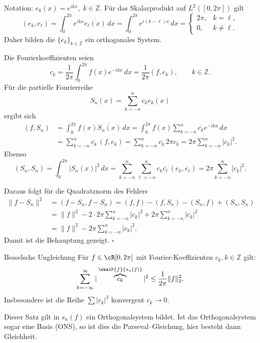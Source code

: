 \begin{beweisbox}
    Notation: $e_k(x)=e^{ikx},\; k\in\mathbb{Z}$. Für das Skalarprodukt auf $L^2([0,2\pi])$ gilt
    $$
    (e_k,e_\ell)=\int_0^{2\pi} e^{ikx}\overline{e_\ell(x)}\,dx
    =\int_0^{2\pi} e^{i(k-\ell)x}\,dx
    =\begin{cases}2\pi,& k=\ell,\\[4pt]0,& k\neq\ell.\end{cases}
    $$
    Daher bilden die $\{e_k\}_{k\in\mathbb{Z}}$ ein orthogonales System.

    Die Fourierkoeffizienten seien
    $$
    c_k=\frac{1}{2\pi}\int_0^{2\pi} f(x)e^{-ikx}\,dx=\frac{1}{2\pi}(f,e_k),
    \qquad k\in\mathbb{Z}.
    $$
    Für die partielle Fourierreihe
    $$
    S_n(x)=\sum_{k=-n}^{n} c_k e_k(x)
    $$
    ergibt sich
    \begin{align*}
    (f,S_n)
    &=\int_0^{2\pi} f(x)\overline{S_n(x)}\,dx
    =\int_0^{2\pi} f(x)\sum_{k=-n}^{n}\overline{c_k}e^{-ikx}\,dx\\
    &=\sum_{k=-n}^{n}\overline{c_k}\,(f,e_k)
    =\sum_{k=-n}^{n}\overline{c_k}\,2\pi c_k
    =2\pi\sum_{k=-n}^{n}|c_k|^2.
    \end{align*}
    Ebenso
    $$
    (S_n,S_n)=\int_0^{2\pi}|S_n(x)|^2\,dx
    =\sum_{k=-n}^{n}\sum_{\ell=-n}^{n} c_k\overline{c_\ell}\,(e_k,e_\ell)
    =2\pi\sum_{k=-n}^{n}|c_k|^2.
    $$

    Daraus folgt für die Quadratznorm des Fehlers
    \begin{align*}
    \|f-S_n\|^2
    &=(f-S_n,f-S_n)=(f,f)-(f,S_n)-(S_n,f)+(S_n,S_n)\\
    &=\|f\|^2-2\cdot 2\pi\sum_{k=-n}^{n}|c_k|^2+2\pi\sum_{k=-n}^{n}|c_k|^2\\
    &=\|f\|^2-2\pi\sum_{k=-n}^{n}|c_k|^2.
    \end{align*}
    Damit ist die Behauptung gezeigt. $\square$
\end{beweisbox}

\begin{satz}{Besselsche Ungleichung}
    Für $f \in \cR[0,2\pi]$ mit Fourier-Koeffizienten $c_k, k \in \mathbb{Z}$ gilt:
    $$
        \sum_{k=-\infty}^{\infty} |\overbrace{c_k}^{\skalP{f}{s_n(f)}}|^2 \le \frac{1}{2\pi}\|f\|_2^2.
    $$
    Insbesondere ist die Reihe $\sum |c_k|^2$ konvergent $c_k \to 0$.
\end{satz}
Dieser Satz gilt in $s_n(f)$ ein Orthogonalsystem bildet. Ist das Orthogonalsystem sogar eine Basis (ONS), so ist dies die Parseval--Gleichung, hier besteht dann Gleichheit.

